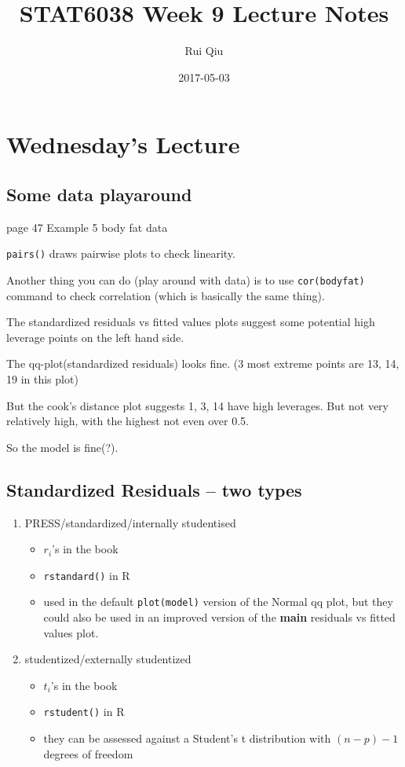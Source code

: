 \documentclass[a4paper, 11pt, twoside]{article}
\begin{document}
\title{STAT6038 Week 9 Lecture Notes}
\author{Rui Qiu}
\date{2017-05-03}

\maketitle

\section{Wednesday's Lecture}

\subsection{Some data playaround}

page 47 Example 5 body fat data

\texttt{pairs()} draws pairwise plots to check linearity.

Another thing you can do (play around with data) is to use \texttt{cor(bodyfat)} command to check correlation (which is basically the same thing).

The standardized residuals vs fitted values plots suggest some potential high leverage points on the left hand side.

The qq-plot(standardized residuals) looks fine. (3 most extreme points are 13, 14, 19 in this plot)

But the cook's distance plot suggests 1, 3, 14 have high leverages. But not very relatively high, with the highest not even over 0.5.

So the model is fine(?).

\subsection{Standardized Residuals -- two types}
\begin{enumerate}
	\item PRESS/standardized/internally studentised
	\begin{itemize}
		\item $r_i$'s in the book
		\item \texttt{rstandard()} in R
		\item used in the default \texttt{plot(model)} version of the Normal qq plot, but they could also be used in an improved version of the \textbf{main} residuals vs fitted values plot.
	\end{itemize}
	\item studentized/externally studentized
	\begin{itemize}
		\item $t_i$'s in the book
		\item \texttt{rstudent()} in R
		\item they can be assessed against a Student's t distribution with $(n-p)-1$ degrees of freedom
	\end{itemize}
\end{enumerate}
\end{document}
